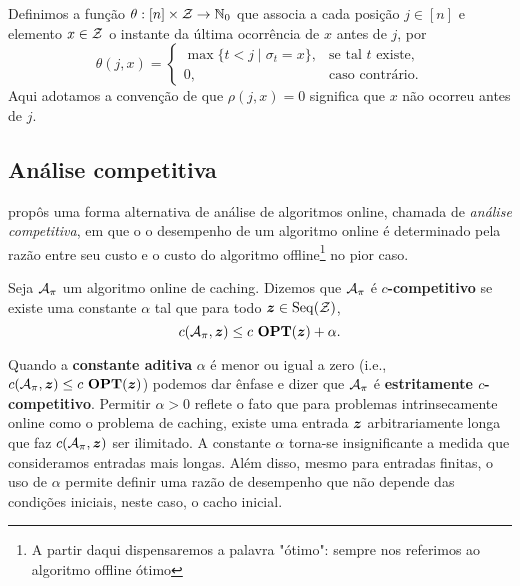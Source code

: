 \begin{definition}
Definimos a função \(\theta : [n] \times \mathcal{Z} \to \mathbb{N}_0\) que associa a cada posição \(j \in [n]\) e elemento \(x \in \mathcal{Z}\) o instante da última ocorrência de \(x\) antes de \(j\), por
\begin{equation}
\theta(j, x) =
\begin{cases}
  \max\{ t < j \mid \sigma_t = x \}, & \text{se tal } t \text{ existe}, \\[6pt]
  0, & \text{caso contrário}.
\end{cases}
\end{equation}
Aqui adotamos a convenção de que \(\rho(j,x)=0\) significa que \(x\) não ocorreu antes de \(j\).
\end{definition}

\subsection{Análise competitiva}

\textcite{Sleator93} propôs uma forma alternativa de análise de algoritmos online, chamada de \emph{análise competitiva}, em que o o desempenho de um algoritmo online é determinado pela razão entre seu custo e o custo do algoritmo offline\footnote{A partir daqui dispensaremos a palavra "ótimo": sempre nos referimos ao algoritmo offline ótimo} no pior caso.
\begin{definition}
  \label{def:comp}
  Seja \(\mathcal{A}_\pi\) um algoritmo online de caching. Dizemos que \(\mathcal{A}_\pi\) é \(c\)\textbf{-competitivo} se existe uma constante \(\alpha\) tal que para todo \(\bm{z} \in \operatorname{Seq}(\mathcal{Z})\),
\begin{equation}
  c(\mathcal{A}_\pi, \bm{z} ) \le c \ \textbf{OPT}(\bm{z}) + \alpha.
\end{equation}
\end{definition}

Quando a \textbf{constante aditiva} \(\alpha\) é menor ou igual a zero (i.e., \(c(\mathcal{A}_\pi, \bm{z}) \le c \ \textbf{OPT}(\bm{z})\)) podemos dar ênfase e dizer que \(\mathcal{A}_\pi\) é \textbf{estritamente \(c\)-competitivo}. Permitir \(\alpha > 0\) reflete o fato que para problemas intrinsecamente online como o problema de caching, existe uma entrada \(\bm{z}\) arbitrariamente longa que faz \(c(\mathcal{A}_\pi, \bm{z})\) ser ilimitado. A constante \(\alpha\) torna-se insignificante a medida que consideramos entradas mais longas. Além disso, mesmo para entradas finitas, o uso de \(\alpha\) permite definir uma razão de desempenho que não depende das condições iniciais, neste caso, o cacho inicial. 

